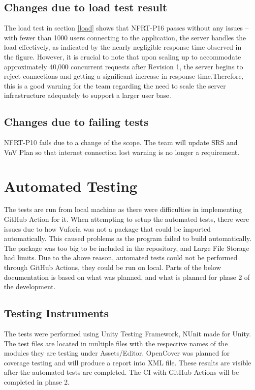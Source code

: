\documentclass[12pt, titlepage]{article}
\begin{document}
\subsection{Changes due to load test result}
The load test in section \ref{load} shows that NFRT-P16 passes without any issues -- with fewer than 1000 users connecting to the application, the server handles the load effectively, as indicated by the nearly negligible response time observed in the figure. However, it is crucial to note that upon scaling up to accommodate approximately 40,000 concurrent requests after Revision 1, the server begins to reject connections and getting a significant increase in response time.Therefore, this is a good warning for the team regarding the need to scale the server infrastructure adequately to support a larger user base.
\subsection{Changes due to failing tests}
NFRT-P10 fails due to a change of the scope. The team will update SRS and VnV Plan so that internet connection lost warning is no longer a requirement.\\

\section{Automated Testing}
The tests are run from local machine as there were difficulties in implementing GitHub Action for it.
When attempting to setup the automated tests, there were issues due to how Vuforia was not a package that could be imported automatically.
This caused problems as the program failed to build automatically. The package was too big to be included in the repository, and Large File Storage had limits.
Due to the above reason, automated tests could not be performed through GitHub Actions, they could be run on local.
Parts of the below documentation is based on what was planned, and what is planned for phase 2 of the development.

\subsection{Testing Instruments}

The tests were performed using Unity Testing Framework, NUnit made for Unity.
The test files are located in multiple files with the respective names of the modules they are testing under Assets/Editor.
OpenCover was planned for coverage testing and will produce a report into XML file.
These results are visible after the automated tests are completed.
The CI with GitHub Actions will be completed in phase 2.
\end{document}
